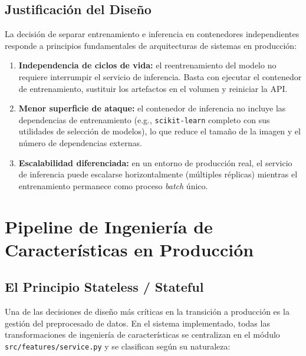 \subsection{Justificación del Diseño}
\label{subsec:justificacion_diseno}

La decisión de separar entrenamiento e inferencia en contenedores independientes responde a principios fundamentales de arquitecturas de sistemas en producción:

\begin{enumerate}
    \item \textbf{Independencia de ciclos de vida:} el reentrenamiento del modelo no requiere interrumpir el servicio de inferencia. Basta con ejecutar el contenedor de entrenamiento, sustituir los artefactos en el volumen y reiniciar la API.
    \item \textbf{Menor superficie de ataque:} el contenedor de inferencia no incluye las dependencias de entrenamiento (e.g., \texttt{scikit-learn} completo con sus utilidades de selección de modelos), lo que reduce el tamaño de la imagen y el número de dependencias externas.
    \item \textbf{Escalabilidad diferenciada:} en un entorno de producción real, el servicio de inferencia puede escalarse horizontalmente (múltiples réplicas) mientras el entrenamiento permanece como proceso \textit{batch} único.
\end{enumerate}

\section{Pipeline de Ingeniería de Características en Producción}
\label{sec:features_produccion}

\subsection{El Principio Stateless / Stateful}
\label{subsec:stateless_stateful}

Una de las decisiones de diseño más críticas en la transición a producción es la gestión del preprocesado de datos. En el sistema implementado, todas las transformaciones de ingeniería de características se centralizan en el módulo \texttt{src/features/service.py} y se clasifican según su naturaleza:

